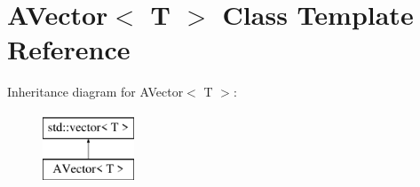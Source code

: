 \hypertarget{class_a_vector}{}\section{A\+Vector$<$ T $>$ Class Template Reference}
\label{class_a_vector}
Inheritance diagram for A\+Vector$<$ T $>$\+:\begin{figure}[H]
\begin{center}
\leavevmode
\includegraphics[height=2.000000cm]{class_a_vector}
\end{center}
\end{figure}
